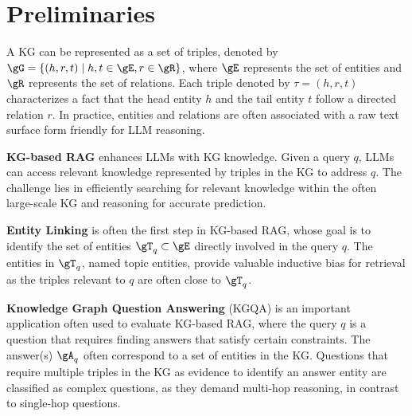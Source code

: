 \section{Preliminaries}

A KG can be represented as a set of triples, denoted by $\gG=\{(h, r, t)\mid h, t \in \gE, r\in \gR\}$, where $\gE$ represents the set of entities and $\gR$ represents the set of relations. Each triple denoted by $\tau = (h, r, t)$ characterizes a fact that the head entity $h$ and the tail entity $t$ follow a directed relation $r$. In practice, entities and relations are often associated with a raw text surface form friendly for LLM reasoning.

\textbf{KG-based RAG} enhances LLMs with KG knowledge. Given a query $q$, LLMs can access relevant knowledge represented by triples in the KG to address $q$. The challenge lies in efficiently searching for relevant knowledge within the often large-scale KG and reasoning for accurate prediction.

\textbf{Entity Linking} is often the first step in KG-based RAG, whose goal is to identify the set of entities $\gT_q\subset \gE$ directly involved in the query $q$. The entities in $\gT_q$, named topic entities, provide valuable inductive bias for retrieval as the triples relevant to $q$ are often close to $\gT_q$.

\textbf{Knowledge Graph Question Answering} (KGQA) is an important application often used to evaluate KG-based RAG, where the query $q$ is a question that requires finding answers that satisfy certain constraints. The answer(s) $\gA_q$ often correspond to a set of entities in the KG. Questions that require multiple triples in the KG as evidence to identify an answer entity are classified as complex questions, as they demand multi-hop reasoning, in contrast to single-hop questions.
